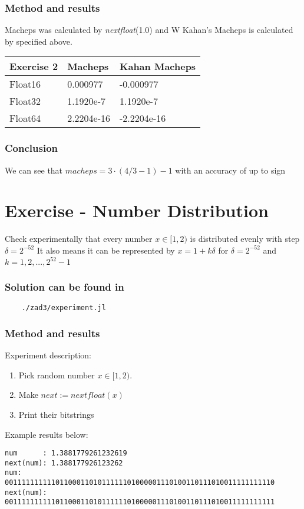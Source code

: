 \documentclass[12pt]{article}
\begin{document}
\subsubsection*{Method and results}
Macheps was calculated by \emph{nextfloat}(1.0) and W Kahan's Macheps is calculated by specified above.
\begin{table}[!ht]
    \centering
    \begin{tabular}{|l|l|l|}
    \hline
        Exercise 2 & Macheps & Kahan Macheps \\ \hline
        Float16 & 0.000977 & -0.000977 \\ \hline
        Float32 & 1.1920e-7 & 1.1920e-7 \\ \hline
        Float64 & 2.2204e-16 & -2.2204e-16 \\ \hline
    \end{tabular}
\end{table}
\subsubsection*{Conclusion}
We can see that $macheps = 3\cdot(4/3-1)-1$ with an accuracy of up to sign
\section{Exercise - Number Distribution}
Check experimentally that every number $ x \in [1, 2) $ is distributed evenly with step $\delta = 2^{-52}$
It also means it can be represented by $ x = 1 + k\delta $ for $\delta = 2^{-52}$ and $k=1,2,...,2^{52}-1$
\subsubsection*{Solution can be found in}
\begin{verbatim}
    ./zad3/experiment.jl
\end{verbatim}
\subsubsection*{Method and results}
Experiment description: 
\begin{enumerate}
\item Pick random number $x \in [1,2)$. 
\item Make $next := nextfloat(x)$ 
\item Print their bitstrings
\end{enumerate}
Example results below:
\begin{verbatim}
num      : 1.3881779261232619
next(num): 1.388177926123262
num:       0011111111110110001101011111101000001110100110111010011111111110
next(num): 0011111111110110001101011111101000001110100110111010011111111111
\end{verbatim}
\end{document}
